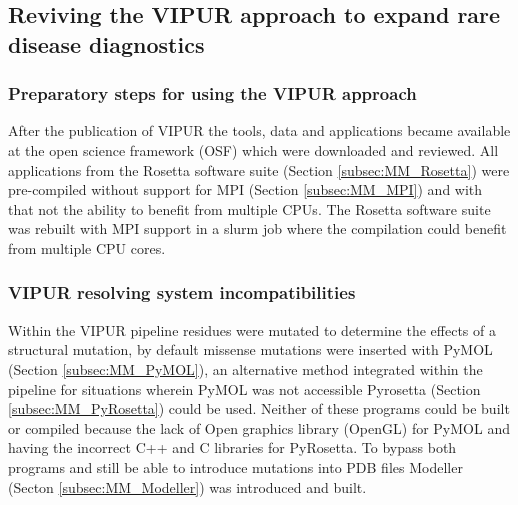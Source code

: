 \subsection{Reviving the VIPUR approach to expand rare disease diagnostics}
	\subsubsection{Preparatory steps for using the VIPUR approach}
		After the publication of VIPUR the tools, data and applications became available at the open science framework (OSF) \cite{} which were downloaded and reviewed. All applications from the Rosetta software suite (Section \ref{subsec:MM_Rosetta}) were pre-compiled without support for MPI (Section \ref{subsec:MM_MPI}) and with that not the ability to benefit from multiple CPUs. The Rosetta software suite was rebuilt with MPI support in a slurm job where the compilation could benefit from multiple CPU cores.
	\label{subsubsec:RES_Prepare}
	
	\subsubsection{VIPUR resolving system incompatibilities}
	Within the VIPUR pipeline residues were mutated to determine the effects of a structural mutation, by default missense mutations were inserted with PyMOL (Section \ref{subsec:MM_PyMOL}), an alternative method integrated within the pipeline for situations wherein PyMOL was not accessible Pyrosetta (Section \ref{subsec:MM_PyRosetta}) could be used. Neither of these programs could be built or compiled because the lack of Open graphics library (OpenGL) for PyMOL and having the incorrect C++ and C libraries for PyRosetta. To bypass both programs and still be able to introduce mutations into PDB files Modeller (Secton \ref{subsec:MM_Modeller}) was introduced and built.
	
